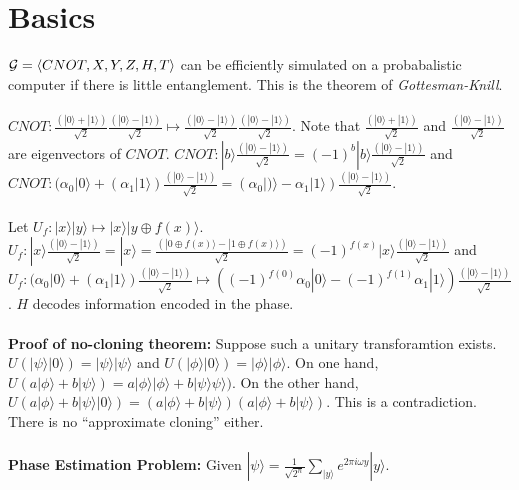 \section{Basics}
${\cal G}= \langle CNOT, X,Y,Z,H,T \rangle$ can be efficiently simulated on a probabalistic
computer if there is little entanglement.  This is the theorem of \emph{Gottesman-Knill}.
\\
\\
$CNOT:
{\frac {(| 0 \rangle + |1 \rangle)} {\sqrt 2}}
{\frac {(| 0 \rangle - |1 \rangle)} {\sqrt 2}}
\mapsto
{\frac {(| 0 \rangle - |1 \rangle)} {\sqrt 2}}
{\frac {(| 0 \rangle - |1 \rangle)} {\sqrt 2}}
$.  Note that
${\frac {(| 0 \rangle + |1 \rangle)} {\sqrt 2}}$ and
${\frac {(| 0 \rangle - |1 \rangle)} {\sqrt 2}}$ are eigenvectors of $CNOT$.
$CNOT: |b \rangle
{\frac {(| 0 \rangle - |1 \rangle)} {\sqrt 2}} = (-1)^b |b \rangle
{\frac {(| 0 \rangle - |1 \rangle)} {\sqrt 2}}
$
and
$CNOT: 
(\alpha_0 |0 \rangle +
(\alpha_1 |1 \rangle)
{\frac {(| 0 \rangle - |1 \rangle)} {\sqrt 2}} = 
(\alpha_0 |)\rangle-\alpha_1 |1\rangle)
{\frac {(| 0 \rangle - |1 \rangle)} {\sqrt 2}}
$.
\\
\\
Let 
$U_f: |x\rangle 
|y\rangle \mapsto
|x\rangle |y \oplus f(x)\rangle $.
$U_f: |x\rangle {\frac {(| 0 \rangle - |1 \rangle)} {\sqrt 2}} = 
|x\rangle=
{\frac {(| 0  \oplus f(x)\rangle - |1 \oplus f(x) \rangle)} {\sqrt 2}} = 
(-1)^{f(x)}
|x\rangle
{\frac {(| 0 \rangle - |1 \rangle)} {\sqrt 2}} $ and
$U_f: 
(\alpha_0 |0 \rangle+
(\alpha_1 |1 \rangle)
{\frac {(| 0 \rangle - |1 \rangle)} {\sqrt 2}} \mapsto
((-1)^{f(0)}\alpha_0 |0\rangle-(-1)^{f(1)}\alpha_1 |1\rangle)
{\frac {(| 0 \rangle - |1 \rangle)} {\sqrt 2}}
$. $H$ decodes information encoded in the phase.
\\
\\
{\bf Proof of no-cloning theorem:}  Suppose such a unitary transforamtion exists.
$U(|\psi\rangle |0\rangle)= |\psi\rangle |\psi \rangle$ and
$U(|\phi\rangle |0\rangle)= |\phi\rangle |\phi \rangle$. 
On one hand,
$U( a | \phi \rangle + b | \psi \rangle )= a | \phi \rangle | \phi \rangle + b | \psi \rangle \psi \rangle )$.
On the other hand,
$U( a | \phi \rangle + b | \psi \rangle |0\rangle )= (a | \phi \rangle + b | \psi \rangle )
(a | \phi \rangle + b | \psi \rangle )$.  This is a contradiction.  There is no ``approximate cloning'' either.
\\
\\
{\bf Phase Estimation Problem:}  
Given 
$|\psi\rangle= {\frac 1 {{\sqrt {2^n}}}} \sum_{|y\rangle} e^{2 \pi i \omega y} |y\rangle$.
